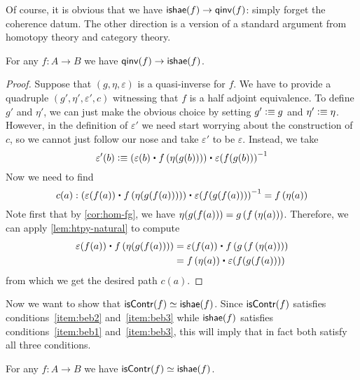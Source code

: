 Of course, it is obvious that we have $\mathsf{ishae}(f) \to\mathsf{qinv}(f)$: simply forget the coherence datum.
The other direction is a version of a standard argument from homotopy theory and category theory.

\begin{thm}\label{thm:equiv-iso-adj}
  For any $f:A\to B$ we have $\mathsf{qinv}(f)\to\mathsf{ishae}(f)$.
\end{thm}
\begin{proof}
Suppose that $(g,\eta,\varepsilon)$ is a quasi-inverse for $f$. We have to provide
a quadruple $(g',\eta',\varepsilon',c)$ witnessing that $f$ is a half adjoint equivalence. To
define $g'$ and $\eta'$, we can just make the obvious choice by setting $g'
\vcentcolon\equiv g$ and $\eta'\vcentcolon\equiv \eta$. However, in the definition of $\varepsilon'$ we
need start worrying about the construction of $c$, so we cannot just follow our nose
and take $\varepsilon'$ to be $\varepsilon$. Instead, we take
\begin{equation*}
\varepsilon'(b) \defeq (\varepsilon(b)\ct \ap{f}{\eta(g(b))})\ct \opp{\varepsilon(f(g(b)))}
\end{equation*}
Now we need to find
\begin{equation*}
c(a):(\varepsilon(f(a))\ct \ap{f}{\eta(g(f(a)))})\ct \opp{\varepsilon(f(g(f(a))))}=\ap{f}{\eta(a)}
\end{equation*}
Note first that by \autoref{cor:hom-fg}, we have 
$\eta(g(f(a)))={g}\left({{f}\left({\eta(a)}\right)}\right)$. Therefore, we can apply
\autoref{lem:htpy-natural} to compute
\begin{align*}
\varepsilon(f(a))\ct \ap{f}{\eta(g(f(a)))}
& = \varepsilon(f(a))\ct \ap{f}{\ap{g}{\ap{f}{\eta(a)}}}\\
& = \ap{f}{\eta(a)}\ct\varepsilon(f(g(f(a))))
\end{align*}
from which we get the desired path $c(a)$.
\end{proof}

Now we want to show that $\mathsf{isContr}(f) \simeq \mathsf{ishae}(f)$.
Since $\mathsf{isContr}(f)$ satisfies conditions~\ref{item:beb2} and~\ref{item:beb3} while $\mathsf{ishae}(f)$ satisfies conditions~\ref{item:beb1} and~\ref{item:beb3}, this will imply that in fact both satisfy all three conditions.

\begin{thm}\label{thm:equiv-contr-hae}
  For any $f:A\to B$ we have $\mathsf{isContr}(f) \simeq \mathsf{ishae}(f)$.
\end{thm}

